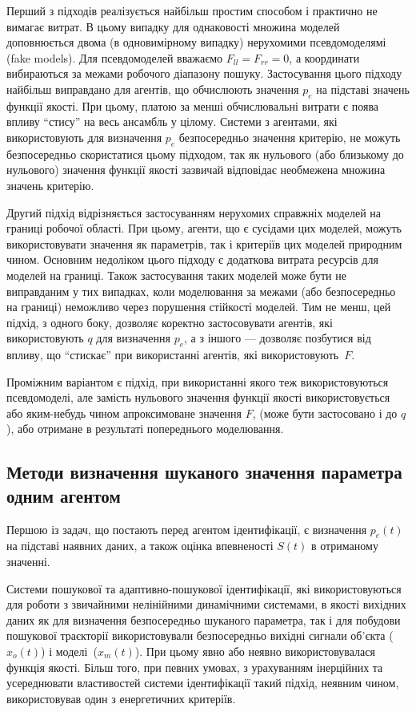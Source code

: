 Перший з підходів реалізується найбільш простим способом і
практично не вимагає витрат. В цьому випадку для однаковості
множина моделей доповнюється двома (в одновимірному випадку)
нерухомими псевдомоделямі (fake models). Для псевдомоделей вважаємо
$F_{ll} = F_{rr} = 0$, а координати вибираються за межами робочого
діапазону пошуку. Застосування цього підходу найбільш
виправдано для агентів, що обчислюють значення
$p_e$ на підставі значень функції якості. При цьому, платою за менші обчислювальні
витрати є поява  впливу ``стису'' на весь ансамбль у
цілому. Системи з агентами, які використовують для визначення
$p_e$ безпосередньо значення критерію, не можуть безпосередньо
скористатися цьому підходом, так як нульового (або близькому
до нульового) значення функції якості зазвичай відповідає
необмежена множина значень критерію.

Другий підхід відрізняється застосуванням нерухомих
справжніх моделей на границі робочої області. При цьому,
агенти, що є сусідами цих моделей, можуть використовувати
значення як параметрів, так і критеріїв цих моделей природним
чином. Основним недоліком цього підходу є додаткова витрата
ресурсів для моделей на границі. Також застосування таких
моделей може бути не виправданим у  тих випадках, коли моделювання за межами
(або безпосередньо на границі) неможливо через порушення
стійкості моделей. Тим не менш, цей підхід, з одного боку,
дозволяє коректно застосовувати агентів, які використовують
$q$ для визначення $p_e$,
а з іншого --- дозволяє позбутися від впливу, що ``стискає'' при
використанні агентів, які використовують~$F$.

Проміжним варіантом є підхід, при використанні якого
теж використовуються псевдомоделі, але замість нульового
значення функції якості використовується або яким-небудь чином
апроксимоване значення
$F$, (може бути застосовано і до $q$),
або отримане в результаті попереднього моделювання.




\subsection{Методи визначення шуканого значення параметра одним агентом} %

Першою із задач, що постають перед агентом ідентифікації, є визначення $p_e(t)$
на підставі наявних даних, а також оцінка впевненості $S(t)$ в
отриманому значенні.

Системи пошукової та адаптивно-пошукової ідентифікації,
які використовуються для роботи з звичайними нелінійними
динамічними системами, в якості вихідних даних як для визначення
безпосередньо шуканого параметра, так і для побудови пошукової
траєкторії використовували безпосередньо вихідні сигнали
об'єкта ($x_o(t)$) і моделі~($x_m(t)$).
При цьому явно або неявно використовувалася функція
якості. Більш того, при певних умовах, з урахуванням інерційних
та усереднювати властивостей системи ідентифікації такий
підхід, неявним чином, використовував один з енергетичних
критеріїв.

